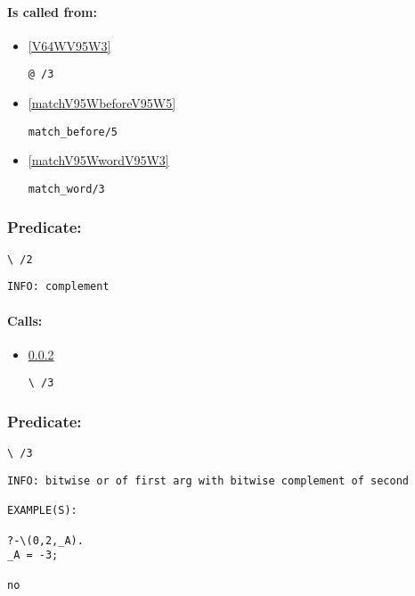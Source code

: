 \paragraph{Is called from:} 
\begin{itemize}
\item \ref{V64WV95W3} 
\begin{verbatim}
@ /3
\end{verbatim}

\item \ref{matchV95WbeforeV95W5} 
\begin{verbatim}
match_before/5
\end{verbatim}

\item \ref{matchV95WwordV95W3} 
\begin{verbatim}
match_word/3
\end{verbatim}

\end{itemize}

\subsubsection{Predicate:} \label{V92WV95W2}

\begin{verbatim}
\ /2
\end{verbatim}

{\small \begin{verbatim}
INFO: complement

\end{verbatim}}
\paragraph{Calls:} 
\begin{itemize}
\item \ref{V92WV95W3} 
\begin{verbatim}
\ /3
\end{verbatim}

\end{itemize}

\subsubsection{Predicate:} \label{V92WV95W3}

\begin{verbatim}
\ /3
\end{verbatim}

{\small \begin{verbatim}
INFO: bitwise or of first arg with bitwise complement of second

EXAMPLE(S):

?-\(0,2,_A).
_A = -3;

no

\end{verbatim}}
